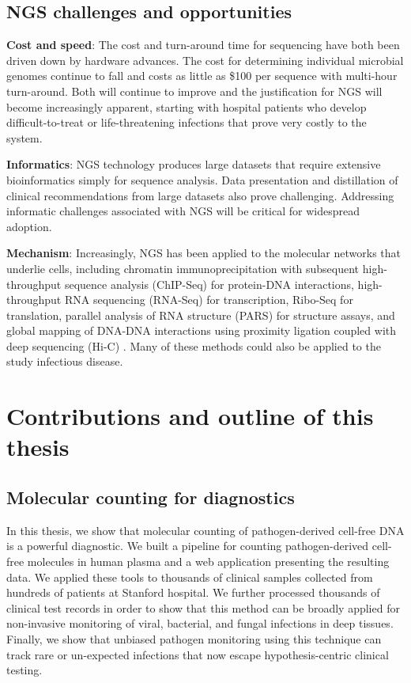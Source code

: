 \subsection{NGS challenges and opportunities}

\textbf{Cost and speed}: The cost and turn-around time for sequencing have both been driven down by hardware advances. The cost for determining individual microbial genomes continue to fall and costs as little as \$100 per sequence \cite{Fox:2014fj} with multi-hour turn-around. Both will continue to improve and the justification for NGS will become increasingly apparent, starting with hospital patients who develop difficult-to-treat or life-threatening infections that prove very costly to the system.

\textbf{Informatics}: NGS technology produces large datasets that require extensive bioinformatics simply for sequence analysis. Data presentation and distillation of clinical recommendations from large datasets also prove challenging. Addressing informatic challenges associated with NGS will be critical for widespread adoption.
 
\textbf{Mechanism}: Increasingly, NGS has been applied to the molecular networks that underlie cells, including chromatin immunoprecipitation with subsequent high-throughput sequence analysis (ChIP-Seq) for protein-DNA interactions, high-throughput RNA sequencing (RNA-Seq) for transcription, Ribo-Seq for translation, parallel analysis of RNA structure (PARS) for structure assays, and global mapping of DNA-DNA interactions using proximity ligation coupled with deep sequencing (Hi-C) \cite{Shendure:2012et}. Many of these methods could also be applied to the study infectious disease. 

\section{Contributions and outline of this thesis}

\subsection{Molecular counting for diagnostics}

In this thesis, we show that molecular counting of pathogen-derived cell-free DNA is a powerful diagnostic. We built a pipeline for counting pathogen-derived cell-free molecules in human plasma and a web application presenting the resulting data. We applied these tools to thousands of clinical samples collected from hundreds of patients at Stanford hospital. We further processed thousands of clinical test records in order to show that this method can be broadly applied for non-invasive monitoring of viral, bacterial, and fungal infections in deep tissues. Finally, we show that unbiased pathogen monitoring using this technique can track rare or un-expected infections that now escape hypothesis-centric clinical testing.
   
